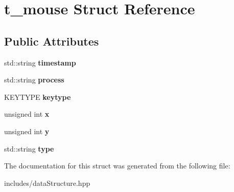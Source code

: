 \section{t\+\_\+mouse Struct Reference}
\label{structt__mouse}
\subsection*{Public Attributes}
\begin{DoxyCompactItemize}
\item 
\mbox{\label{structt__mouse_ad4a9cc684c5e668072a860f5a249b538}} 
std\+::string {\bfseries timestamp}
\item 
\mbox{\label{structt__mouse_a3e244db37dfeacdb68f4fe459f803bc6}} 
std\+::string {\bfseries process}
\item 
\mbox{\label{structt__mouse_a0dbaab92c05cd9dde88b19712bae0eb2}} 
K\+E\+Y\+T\+Y\+PE {\bfseries keytype}
\item 
\mbox{\label{structt__mouse_a86301d081859d7424ef091644a47e90a}} 
unsigned int {\bfseries x}
\item 
\mbox{\label{structt__mouse_aa08a4efb666d232849ad00d40b284465}} 
unsigned int {\bfseries y}
\item 
\mbox{\label{structt__mouse_ab97069f80b817be163e47bf5ded02067}} 
std\+::string {\bfseries type}
\end{DoxyCompactItemize}


The documentation for this struct was generated from the following file\+:\begin{DoxyCompactItemize}
\item 
includes/data\+Structure.\+hpp\end{DoxyCompactItemize}

